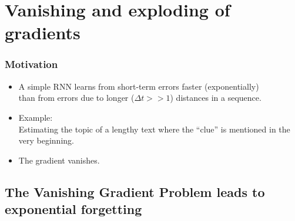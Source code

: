 \section{Vanishing and exploding of gradients}



\begin{frame}\frametitle{Motivation}
	\begin{itemize}
	\setlength\itemsep{1cm}
	\item[]
	A simple RNN learns from short-term errors faster (exponentially)\\
	than from errors due to longer ($\Delta t >\!\!> 1$) distances in a sequence.\\
	
	\item[]Example:\\Estimating the topic of a lengthy text where the ``clue'' is mentioned in the very beginning.\\
	
	\item[]The gradient vanishes.
	\end{itemize}
\end{frame}

\subsection{The Vanishing Gradient Problem leads to exponential forgetting}

